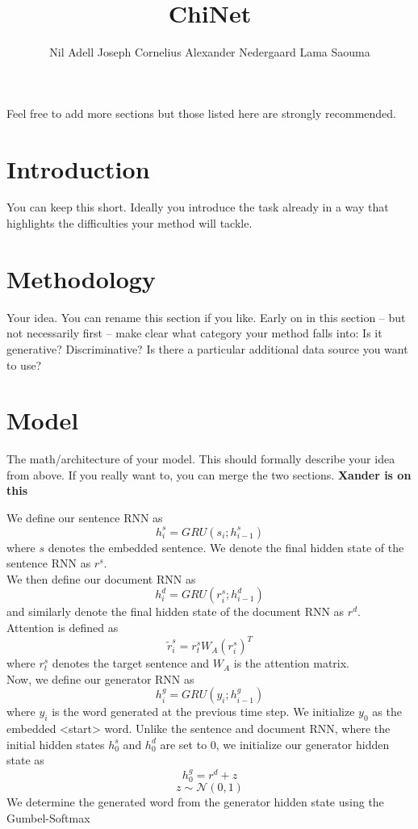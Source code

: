 \documentclass{article}
\title{ChiNet}
\author{Nil Adell \qquad Joseph Cornelius \qquad Alexander Nedergaard \qquad Lama Saouma}
\begin{document}

\maketitle


Feel free to add more sections but those listed here are strongly recommended.
\section{Introduction}
You can keep this short. Ideally you introduce the task already in a way that highlights the difficulties  your method will tackle.
\section{Methodology}
Your idea. You can rename this section if you like. Early on in this section -- but not necessarily first -- make clear what category your method falls into: Is it generative? Discriminative? Is there a particular additional data source you want to use?
\section{Model}
The math/architecture of your model. This should formally describe your idea from above. If you really want to, you can merge the two sections. \textbf{Xander is on this}

We define our sentence RNN as
$$ h^{s}_{i} = GRU(s_{i}; h^{s}_{i-1})$$
where $s$ denotes the embedded sentence. We denote the final hidden state of the sentence RNN as $r^{s}$. \\
We then define our document RNN as
$$ h^{d}_{i} = GRU(r^{s}_{i}; h^{d}_{i-1}) $$
and similarly denote the final hidden state of the document RNN as $r^{d}$. \\
Attention is defined as
$$ \tilde{r}^{s}_{i} = r^{s}_{t}W_{A}(r^{s}_{i})^{T} $$
where $r^{s}_{t}$ denotes the target sentence and $W_{A}$ is the attention matrix. \\
Now, we define our generator RNN as
$$ h^{g}_{i} = GRU(y_{i}; h^{g}_{i-1}) $$
where $y_{i}$ is the word generated at the previous time step. We initialize $y_{0}$ as the embedded <start> word. Unlike the sentence and document RNN, where the initial hidden states $h^{s}_{0}$ and $h^{d}_{0}$ are set to 0, we initialize our generator hidden state as
$$ h^{g}_{0} = r^{d} + z $$
$$ z \sim \mathcal{N}(0,1) $$
We determine the generated word from the generator hidden state using the Gumbel-Softmax
\end{document}
